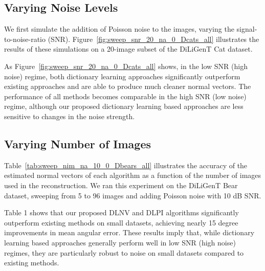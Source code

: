 \subsection{Varying Noise Levels}

We first simulate the addition of Poisson noise to the images, varying the signal-to-noise-ratio (SNR). Figure~\ref{fig:sweep_snr_20_na_0_Dcats_all} illustrates the results of these simulations on a 20-image subset of the DiLiGenT Cat dataset.




As Figure~\ref{fig:sweep_snr_20_na_0_Dcats_all} shows, in the low SNR (high noise) regime, both dictionary learning approaches significantly outperform existing approaches and are able to produce much cleaner normal vectors.  The performance of all methods becomes comparable in the high SNR (low noise) regime, although our proposed dictionary learning based approaches are less sensitive to changes in the noise strength.









\subsection{Varying Number of Images}
Table~\ref{tab:sweep_nim_na_10_0_Dbears_all} illustrates the accuracy of the estimated normal vectors of each algorithm as a function of the number of images used in the reconstruction. We ran this experiment on the DiLiGenT Bear dataset, sweeping from 5 to 96 images and adding Poisson noise with 10 dB SNR.


Table 1 shows that our proposed DLNV and DLPI algorithms significantly outperform existing methods on small datasets, achieving nearly 15 degree improvements in mean angular error. These results imply that, while dictionary learning based approaches generally perform well in low SNR (high noise) regimes, they are particularly robust to noise on small datasets compared to existing methods. 



